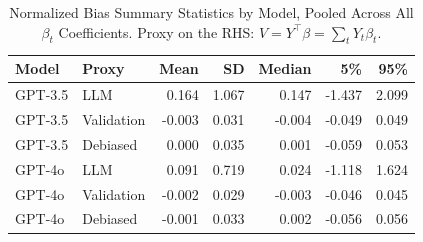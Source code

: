 \begin{table}

\caption{Normalized Bias Summary Statistics by Model, Pooled Across All $\beta_{t}$ Coefficients. Proxy on the RHS: $V = Y^\top \beta = \sum_{t} Y_t \beta_t$.}
\centering
\begin{tabular}[t]{llrrrrr}
\toprule
Model & Proxy & Mean & SD & Median & 5\% & 95\%\\
\midrule
GPT-3.5 & LLM & 0.164 & 1.067 & 0.147 & -1.437 & 2.099\\
GPT-3.5 & Validation & -0.003 & 0.031 & -0.004 & -0.049 & 0.049\\
GPT-3.5 & Debiased & 0.000 & 0.035 & 0.001 & -0.059 & 0.053\\
GPT-4o & LLM & 0.091 & 0.719 & 0.024 & -1.118 & 1.624\\
GPT-4o & Validation & -0.002 & 0.029 & -0.003 & -0.046 & 0.045\\
GPT-4o & Debiased & -0.001 & 0.033 & 0.002 & -0.056 & 0.056\\
\bottomrule
\end{tabular}
\end{table}
